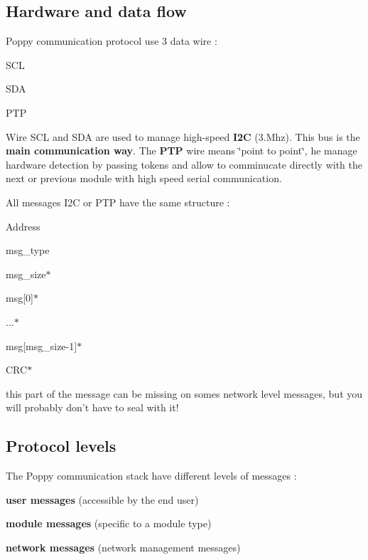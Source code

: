 \subsection*{Hardware and data flow }

Poppy communication protocol use 3 data wire \-:


\begin{DoxyItemize}
\item S\-C\-L
\item S\-D\-A
\item P\-T\-P
\end{DoxyItemize}

Wire S\-C\-L and S\-D\-A are used to manage high-\/speed {\bfseries I2\-C} (3.\-Mhz). This bus is the {\bfseries main communication way}. The {\bfseries P\-T\-P} wire means \char`\"{}point to point\char`\"{}, he manage hardware detection by passing tokens and allow to comminucate directly with the next or previous module with high speed serial communication.

All messages I2\-C or P\-T\-P have the same structure \-:


\begin{DoxyItemize}
\item Address
\item msg\-\_\-type
\item msg\-\_\-size$\ast$
\item msg\mbox{[}0\mbox{]}$\ast$
\item ...$\ast$
\item msg\mbox{[}msg\-\_\-size-\/1\mbox{]}$\ast$
\item C\-R\-C$\ast$
\end{DoxyItemize}

this part of the message can be missing on somes network level messages, but you will probably don't have to seal with it!

\subsection*{Protocol levels }

The Poppy communication stack have different levels of messages \-:


\begin{DoxyItemize}
\item {\bfseries user messages} (accessible by the end user)
\item {\bfseries module messages} (specific to a module type)
\item {\bfseries network messages} (network management messages)
\end{DoxyItemize}


